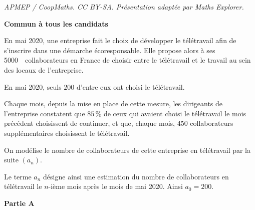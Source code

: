 \documentclass[10pt]{article}
\providecommand{\np}[2][]{{#2~#1}}
\begin{document}
\noindent\textit{APMEP / CoopMaths. CC BY-SA. Présentation adaptée par Maths Explorer.}\par\medskip
\textbf{Commun à tous les candidats}

\medskip

En mai 2020, une entreprise fait le choix de développer le télétravail afin de s'inscrire dans une démarche écoresponsable.
Elle propose alors à ses \np{5000}~collaborateurs en France de choisir entre le télétravail et le travail au sein des locaux de l'entreprise.

En mai 2020, seuls $200$ d'entre eux ont choisi le télétravail.

Chaque mois, depuis la mise en place de cette mesure, les dirigeants de l'entreprise constatent que $85$\,\% de ceux qui avaient choisi le télétravail le mois précédent choisissent de continuer, et que, chaque mois, $450$ collaborateurs supplémentaires choisissent le télétravail.

On modélise le nombre de collaborateurs de cette entreprise en télétravail par la suite $\left(a_n\right)$.

Le terme $a_n$ désigne ainsi une estimation du nombre de collaborateurs en télétravail le $n$-ième mois après le mois de mai 2020. Ainsi $a_0 = 200$.

\bigskip

\textbf{Partie A}

\medskip
\end{document}
